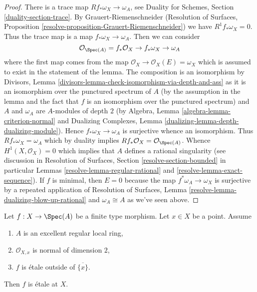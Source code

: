 \begin{proof}
There is a trace map $Rf_*\omega_X \to \omega_A$, see
Duality for Schemes, Section \ref{duality-section-trace}.
By Grauert-Riemenschneider
(Resolution of Surfaces,
Proposition \ref{resolve-proposition-Grauert-Riemenschneider})
we have $R^1f_*\omega_X = 0$.
Thus the trace map is a map $f_*\omega_X \to \omega_A$.
Then we can consider
$$
\mathcal{O}_{\Spec(A)} = f_*\mathcal{O}_X \to f_*\omega_X \to \omega_A
$$
where the first map comes from the map
$\mathcal{O}_X \to \mathcal{O}_X(E) = \omega_X$ which is
assumed to exist in the statement of the lemma.
The composition is an isomorphism by Divisors, Lemma
\ref{divisors-lemma-check-isomorphism-via-depth-and-ass}
as it is an isomorphism over the punctured spectrum of $A$
(by the assumption in the lemma and the fact that $f$ is an isomorphism
over the punctured spectrum) and $A$ and $\omega_A$
are $A$-modules of depth $2$ (by
Algebra, Lemma \ref{algebra-lemma-criterion-normal} and
Dualizing Complexes, Lemma \ref{dualizing-lemma-depth-dualizing-module}).
Hence $f_*\omega_X \to \omega_A$ is surjective whence an isomorphism.
Thus $Rf_*\omega_X = \omega_A$ which by duality implies
$Rf_*\mathcal{O}_X = \mathcal{O}_{\Spec(A)}$.
Whence $H^1(X, \mathcal{O}_X) = 0$ which implies that $A$
defines a rational singularity (see discussion in
Resolution of Surfaces, Section
\ref{resolve-section-bounded} in particular
Lemmas \ref{resolve-lemma-regular-rational} and
\ref{resolve-lemma-exact-sequence}).
If $f$ is minimal, then $E = 0$ because the map
$f^*\omega_A \to \omega_X$ is surjective by
a repeated application of Resolution of Surfaces, Lemma
\ref{resolve-lemma-dualizing-blow-up-rational}
and $\omega_A \cong A$ as we've seen above.
\end{proof}

\begin{lemma}
\label{lemma-key-purity-ramification}
Let $f : X \to \Spec(A)$ be a finite type morphism.
Let $x \in X$ be a point. Assume
\begin{enumerate}
\item $A$ is an excellent regular local ring,
\item $\mathcal{O}_{X, x}$ is normal of dimension $2$,
\item $f$ is \'etale outside of $\overline{\{x\}}$.
\end{enumerate}
Then $f$ is \'etale at $X$.
\end{lemma}

